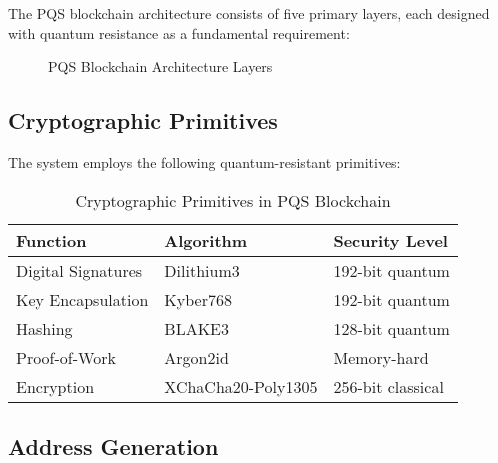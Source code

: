 \documentclass[12pt,a4paper]{article}
\begin{document}
The PQS blockchain architecture consists of five primary layers, each designed with quantum resistance as a fundamental requirement:

\begin{figure}[h]
\centering
{}
\caption{PQS Blockchain Architecture Layers}
\end{figure}

\subsection{Cryptographic Primitives}

The system employs the following quantum-resistant primitives:

\begin{table}[h]
\centering
\begin{tabular}{@{}lll@{}}
\toprule
\textbf{Function} & \textbf{Algorithm} & \textbf{Security Level} \\ \midrule
Digital Signatures & Dilithium3 & 192-bit quantum \\
Key Encapsulation & Kyber768 & 192-bit quantum \\
Hashing & BLAKE3 & 128-bit quantum \\
Proof-of-Work & Argon2id & Memory-hard \\
Encryption & XChaCha20-Poly1305 & 256-bit classical \\
\bottomrule
\end{tabular}
\caption{Cryptographic Primitives in PQS Blockchain}
\end{table}

\subsection{Address Generation}
\end{document}
